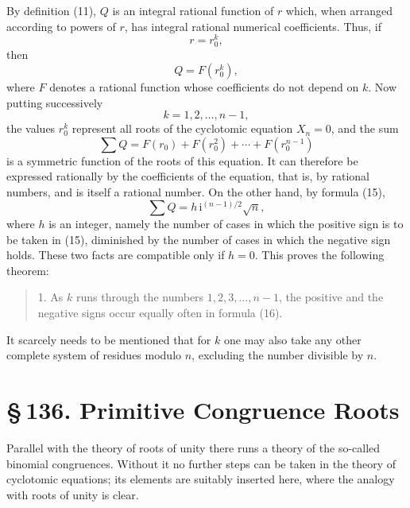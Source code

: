 \documentclass[11pt]{article}
\providecommand{\ii}{\mathrm{i}}
\providecommand{\sect}[2]{\section*{\S\,#1. #2}}
\begin{document}
By definition (11), $Q$ is an integral rational function of $r$ which, when arranged according to powers of $r$, has integral rational numerical coefficients. Thus, if
\[
        r=r_0^k,
\]
then
\[
        Q=F(r_0^k),
\]
where $F$ denotes a rational function whose coefficients do not depend on $k$. Now putting successively
\[
        k=1,2,\ldots,n-1,
\]
the values $r_0^k$ represent all roots of the cyclotomic equation $X_n=0$, and the sum
\[
        \sum Q=F(r_0)+F(r_0^2)+\cdots+F(r_0^{n-1})
\]
is a symmetric function of the roots of this equation. It can therefore be expressed rationally by the coefficients of the equation, that is, by rational numbers, and is itself a rational number. On the other hand, by formula (15),
\[
        \sum Q=h\,\ii^{(n-1)/2}\sqrt n,
\]
where $h$ is an integer, namely the number of cases in which the positive sign is to be taken in (15), diminished by the number of cases in which the negative sign holds. These two facts are compatible only if $h=0$. This proves the following theorem:
\begin{quote}
1. As $k$ runs through the numbers $1,2,3,\ldots,n-1$, the positive and the negative signs occur equally often in formula (16).
\end{quote}
It scarcely needs to be mentioned that for $k$ one may also take any other complete system of residues modulo $n$, excluding the number divisible by $n$.

\sect{136}{Primitive Congruence Roots}

Parallel with the theory of roots of unity there runs a theory of the so-called binomial congruences. Without it no further steps can be taken in the theory of cyclotomic equations; its elements are suitably inserted here, where the analogy with roots of unity is clear.
\end{document}
